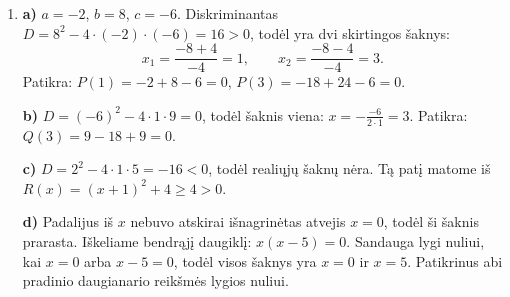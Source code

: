 \documentclass[12pt,a4paper]{article}
\begin{document}
\begin{enumerate}
\textbf{f)} $D=4-20=-16<0$: realiųjų šaknų nėra.
\item \textbf{a)} $a=-2$, $b=8$, $c=-6$. Diskriminantas $D=8^2-4\cdot(-2)\cdot(-6)=16>0$, todėl yra dvi skirtingos šaknys:
\[
x_1=\frac{-8+4}{-4}=1,\qquad x_2=\frac{-8-4}{-4}=3.
\]
Patikra: $P(1)=-2+8-6=0$, $P(3)=-18+24-6=0$.

\textbf{b)} $D=(-6)^2-4\cdot1\cdot9=0$, todėl šaknis viena: $x=-\frac{-6}{2\cdot1}=3$. Patikra: $Q(3)=9-18+9=0$.

\textbf{c)} $D=2^2-4\cdot1\cdot5=-16<0$, todėl realiųjų šaknų nėra. Tą patį matome iš $R(x)=(x+1)^2+4\ge4>0$.

\textbf{d)} Padalijus iš $x$ nebuvo atskirai išnagrinėtas atvejis $x=0$, todėl ši šaknis prarasta. Iškeliame bendrąjį daugiklį: $x(x-5)=0$. Sandauga lygi nuliui, kai $x=0$ arba $x-5=0$, todėl visos šaknys yra $x=0$ ir $x=5$. Patikrinus abi pradinio daugianario reikšmės lygios nuliui.
\end{enumerate}
\end{document}
